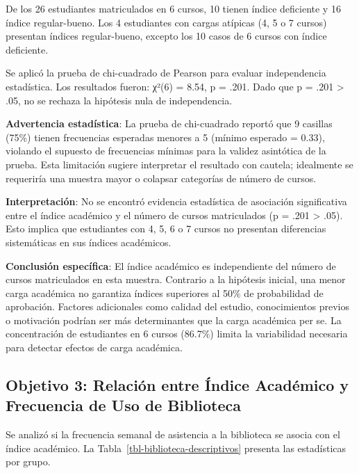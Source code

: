 \documentclass[
  stu,
  floatsintext,
  longtable,
  a4paper,
  nolmodern,
  notxfonts,
  notimes,
  12pt,
  colorlinks=true,linkcolor=blue,citecolor=blue,urlcolor=blue]{apa7}
\begin{document}
De los 26 estudiantes matriculados en 6 cursos, 10 tienen índice
deficiente y 16 índice regular-bueno. Los 4 estudiantes con cargas
atípicas (4, 5 o 7 cursos) presentan índices regular-bueno, excepto los
10 casos de 6 cursos con índice deficiente.

Se aplicó la prueba de chi-cuadrado de Pearson para evaluar
independencia estadística. Los resultados fueron: χ²(6) = 8.54, p =
.201. Dado que p = .201 \textgreater{} .05, no se rechaza la hipótesis
nula de independencia.

\textbf{Advertencia estadística}: La prueba de chi-cuadrado reportó que
9 casillas (75\%) tienen frecuencias esperadas menores a 5 (mínimo
esperado = 0.33), violando el supuesto de frecuencias mínimas para la
validez asintótica de la prueba. Esta limitación sugiere interpretar el
resultado con cautela; idealmente se requeriría una muestra mayor o
colapsar categorías de número de cursos.

\textbf{Interpretación}: No se encontró evidencia estadística de
asociación significativa entre el índice académico y el número de cursos
matriculados (p = .201 \textgreater{} .05). Esto implica que estudiantes
con 4, 5, 6 o 7 cursos no presentan diferencias sistemáticas en sus
índices académicos.

\textbf{Conclusión específica}: El índice académico es independiente del
número de cursos matriculados en esta muestra. Contrario a la hipótesis
inicial, una menor carga académica no garantiza índices superiores al
50\% de probabilidad de aprobación. Factores adicionales como calidad
del estudio, conocimientos previos o motivación podrían ser más
determinantes que la carga académica per se. La concentración de
estudiantes en 6 cursos (86.7\%) limita la variabilidad necesaria para
detectar efectos de carga académica.

\subsection{Objetivo 3: Relación entre Índice Académico y Frecuencia de
Uso de
Biblioteca}\label{objetivo-3-relaciuxf3n-entre-uxedndice-acaduxe9mico-y-frecuencia-de-uso-de-biblioteca}

Se analizó si la frecuencia semanal de asistencia a la biblioteca se
asocia con el índice académico. La
Tabla~\ref{tbl-biblioteca-descriptivos} presenta las estadísticas por
grupo.
\end{document}
